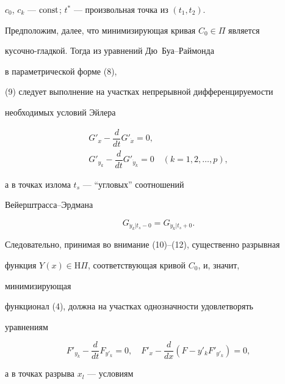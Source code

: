 $c_0$, $c_k$ --- $\operatorname{const}$; $t^*$ --- произвольная точка из $(t_1,t_2)$. 


 


Предположим, далее, что минимизирующая кривая $C_0\in\Pi$ является 


кусочно-гладкой. Тогда из уравнений Дю~Буа--Раймонда 


в параметрической форме (8), 


(9) следует выполнение на участках непрерывной дифференцируемости 


необходимых условий Эйлера 


\begin{equation} 


\begin{array}{c} 


G'_x-\dfrac{d}{dt}G'_{\Dot x}=0,\\[2mm] 


% 


G'_{y_k}-\dfrac{d}{dt}G'_{\Dot y_k}=0\quad 


(k=1,2,\dotsc,p), 


\end{array}


\end{equation} 


а в точках излома $t_s$ --- ``угловых'' соотношений 


Вейерштрасса--Эрдмана 


\begin{equation} 


G_{\Dot y_k|t_s-0}=G_{\Dot y_k|t_s+0}. 


\end{equation} 


 


Следовательно, принимая во внимание (10)--(12), существенно разрывная 


функция $Y(x)\in\mathrm H\Pi$, соответствующая кривой $C_0$, и, значит, 


минимизирующая 


функционал (4), должна на участках однозначности удовлетворять 


уравнениям 


$$ 


F'_{y_k}-\frac{d}{dt}F_{y'_k}=0,\quad 


F'_x-\frac{d}{dx}(F-y'_k F'_{y'_k})=0, 


$$ 


а в точках разрыва $x_l$ --- условиям 


